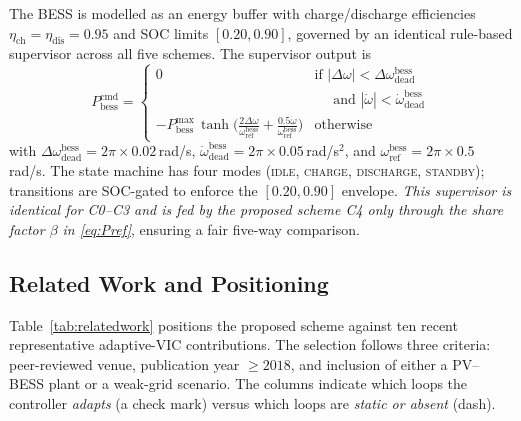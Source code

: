 \documentclass[journal]{IEEEtran}
\begin{document}
The BESS is modelled as an energy buffer with charge/discharge
efficiencies $\eta_\mathrm{ch}=\eta_\mathrm{dis}=0.95$ and SOC limits
$[0.20,0.90]$, governed by an identical rule-based supervisor across
all five schemes. The supervisor output is
\begin{equation}
P_\mathrm{bess}^\mathrm{cmd}=
\begin{cases}
0 & \text{if } |\Delta\omega|<\Delta\omega_\mathrm{dead}^\mathrm{bess}\\
& \quad\text{ and }|\dot\omega|<\dot\omega_\mathrm{dead}^\mathrm{bess}\\
-P_\mathrm{bess}^\mathrm{max}\,\tanh\!\bigl(\tfrac{2\Delta\omega}{\omega_\mathrm{ref}^\mathrm{bess}}+\tfrac{0.5\dot\omega}{\omega_\mathrm{ref}^\mathrm{bess}}\bigr) & \text{otherwise}
\end{cases}
\label{eq:bess_sup}
\end{equation}
with $\Delta\omega_\mathrm{dead}^\mathrm{bess}=2\pi\!\times\!0.02\,$rad/s,
$\dot\omega_\mathrm{dead}^\mathrm{bess}=2\pi\!\times\!0.05\,$rad/s$^2$,
and $\omega_\mathrm{ref}^\mathrm{bess}=2\pi\!\times\!0.5\,$rad/s. The
state machine has four modes (\textsc{idle},
\textsc{charge}, \textsc{discharge}, \textsc{standby}); transitions
are SOC-gated to enforce the $[0.20,0.90]$ envelope. \emph{This
supervisor is identical for C0--C3 and is fed by the proposed scheme
C4 only through the share factor $\beta$ in \eqref{eq:Pref}}, ensuring
a fair five-way comparison.

\subsection{Related Work and Positioning}
\label{sec:relatedwork}
Table~\ref{tab:relatedwork} positions the proposed scheme against ten
recent representative adaptive-VIC contributions. The selection
follows three criteria: peer-reviewed venue, publication year
$\geq 2018$, and inclusion of either a PV--BESS plant or a
weak-grid scenario. The columns indicate which loops the controller
\emph{adapts} (a check mark) versus which loops are \emph{static or
absent} (dash).
\end{document}
